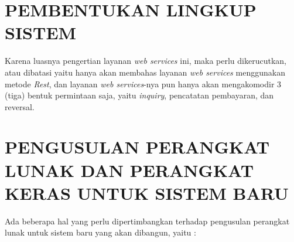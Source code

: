 \documentclass[pdftex, 12pt, oneside]{article}
\begin{document}
\section{PEMBENTUKAN LINGKUP SISTEM}

Karena luasnya pengertian layanan \textit{web services} ini, maka perlu dikerucutkan, atau dibatasi yaitu hanya akan membahas layanan \textit{web services} menggunakan metode \textit{Rest}, dan layanan \textit{web services}-nya pun hanya akan mengakomodir 3 (tiga) bentuk permintaan saja, yaitu \textit{inquiry}, pencatatan pembayaran, dan reversal.


\section{PENGUSULAN PERANGKAT LUNAK DAN PERANGKAT KERAS UNTUK SISTEM BARU}

Ada beberapa hal yang perlu dipertimbangkan terhadap pengusulan perangkat lunak untuk sistem baru yang akan dibangun, yaitu :
\end{document}

